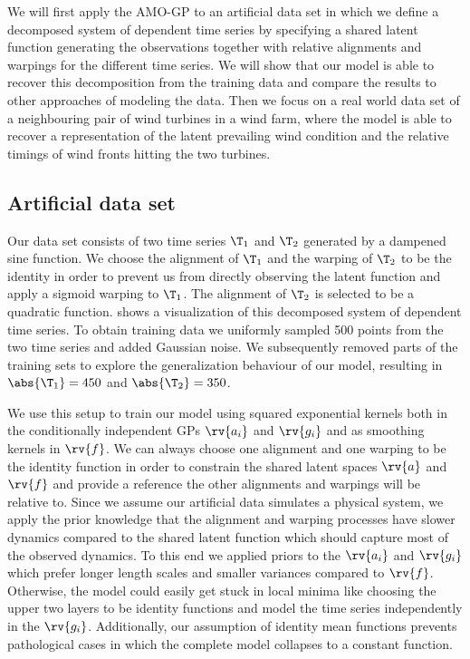 \documentclass{article}
\begin{document}
We will first apply the AMO-GP to an artificial data set in which we define a decomposed system of dependent time series by specifying a shared latent function generating the observations together with relative alignments and warpings for the different time series.
We will show that our model is able to recover this decomposition from the training data and compare the results to other approaches of modeling the data.
Then we focus on a real world data set of a neighbouring pair of wind turbines in a wind farm, where the model is able to recover a representation of the latent prevailing wind condition and the relative timings of wind fronts hitting the two turbines.

\subsection{Artificial data set}
\label{subsec:artificial_example}
Our data set consists of two time series $\T_1$ and $\T_2$ generated by a dampened sine function.
We choose the alignment of $\T_1$ and the warping of $\T_2$ to be the identity in order to prevent us from directly observing the latent function and apply a sigmoid warping to $\T_1$.
The alignment of $\T_2$ is selected to be a quadratic function.
 shows a visualization of this decomposed system of dependent time series.
To obtain training data we uniformly sampled 500 points from the two time series and added Gaussian noise.
We subsequently removed parts of the training sets to explore the generalization behaviour of our model, resulting in $\abs{\T_1}= 450$ and $\abs{\T_2} = 350$.

We use this setup to train our model using squared exponential kernels both in the conditionally independent GPs $\rv{a_i}$ and $\rv{g_i}$ and as smoothing kernels in $\rv{f}$.
We can always choose one alignment and one warping to be the identity function in order to constrain the shared latent spaces $\rv{a}$ and $\rv{f}$ and provide a reference the other alignments and warpings will be relative to.
Since we assume our artificial data simulates a physical system, we apply the prior knowledge that the alignment and warping processes have slower dynamics compared to the shared latent function which should capture most of the observed dynamics.
To this end we applied priors to the $\rv{a_i}$ and $\rv{g_i}$ which prefer longer length scales and smaller variances compared to $\rv{f}$.
Otherwise, the model could easily get stuck in local minima like choosing the upper two layers to be identity functions and model the time series independently in the $\rv{g_i}$.
Additionally, our assumption of identity mean functions prevents pathological cases in which the complete model collapses to a constant function.
\end{document}

